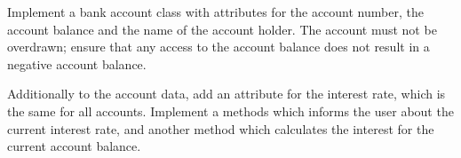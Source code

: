 \begin{aufgabe}
\begin{teilaufgabe}
Implement a bank account class with attributes for the account number, the account balance and the name of the account holder. The account must not be overdrawn; ensure that any access to the account balance does not result in a negative account balance.
\end{teilaufgabe}
\begin{teilaufgabe}
Additionally to the account data, add an attribute for the interest rate, which is the same for all accounts. Implement a methods which informs the user about the current interest rate, and another method which calculates the interest for the current account balance.
\end{teilaufgabe}
\end{aufgabe}

